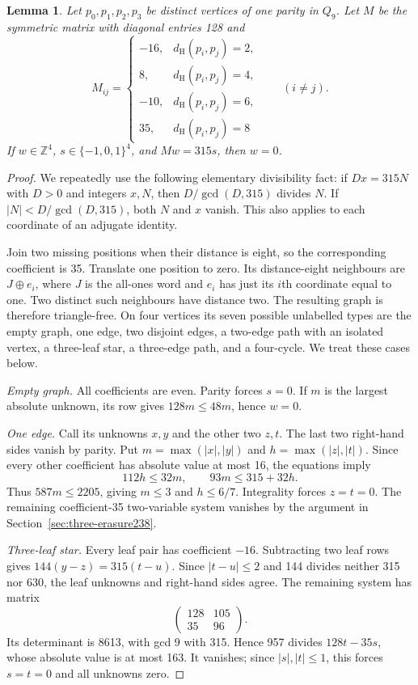 \documentclass[11pt,a4paper]{article}
\newtheorem{lemma}[theorem]{Lemma}
\theoremstyle{definition}
\theoremstyle{remark}
\newcommand{\Ham}{d_{\mathrm H}}
\begin{document}
\begin{lemma}\label{lem:four-matrix239}
Let $p_0,p_1,p_2,p_3$ be distinct vertices of one parity in $Q_9$.
Let $M$ be the symmetric matrix with diagonal entries 128 and
\[
M_{ij}=\begin{cases}
-16,&\Ham(p_i,p_j)=2,\\
8,&\Ham(p_i,p_j)=4,\\
-10,&\Ham(p_i,p_j)=6,\\
35,&\Ham(p_i,p_j)=8
\end{cases}\qquad(i\ne j).
\]
If $w\in\mathbb Z^4$, $s\in\{-1,0,1\}^4$, and $Mw=315s$, then $w=0$.
\end{lemma}
\begin{proof}
We repeatedly use the following elementary divisibility fact:
if $Dx=315N$ with $D>0$ and integers $x,N$, then
$D/\gcd(D,315)$ divides $N$. If $|N|<D/\gcd(D,315)$, both $N$ and $x$
vanish. This also applies to each coordinate of an adjugate identity.

Join two missing positions when their distance is eight, so the
corresponding coefficient is 35. Translate one position to zero.
Its distance-eight neighbours are $J\oplus e_i$, where $J$ is the
all-ones word and $e_i$ has just its $i$th coordinate equal to one.
Two distinct such neighbours have distance two. The resulting graph
is therefore triangle-free. On four vertices its seven possible
unlabelled types are the empty graph, one edge, two disjoint edges,
a two-edge path with an isolated vertex, a three-leaf star, a
three-edge path, and a four-cycle. We treat these cases below.

\smallskip\noindent\emph{Empty graph.}
All coefficients are even. Parity forces $s=0$. If $m$ is the largest
absolute unknown, its row gives $128m\le48m$, hence $w=0$.

\smallskip\noindent\emph{One edge.}
Call its unknowns $x,y$ and the other two $z,t$. The last two right-hand
sides vanish by parity. Put $m=\max(|x|,|y|)$ and
$h=\max(|z|,|t|)$. Since every other coefficient has absolute value at
most 16, the equations imply
\[
112h\le32m,\qquad93m\le315+32h.
\]
Thus $587m\le2205$, giving $m\le3$ and $h\le6/7$. Integrality forces
$z=t=0$. The remaining coefficient-35 two-variable system vanishes by
the argument in Section~\ref{sec:three-erasure238}.

\smallskip\noindent\emph{Three-leaf star.}
Every leaf pair has coefficient $-16$. Subtracting two leaf rows gives
$144(y-z)=315(t-u)$. Since $|t-u|\le2$ and 144 divides neither 315 nor
630, the leaf unknowns and right-hand sides agree. The remaining
system has matrix
\[
\begin{pmatrix}128&105\\35&96\end{pmatrix}.
\]
Its determinant is 8613, with gcd 9 with 315. Hence 957 divides
$128t-35s$, whose absolute value is at most 163. It vanishes; since
$|s|,|t|\le1$, this forces $s=t=0$ and all unknowns zero.


\end{proof}
\end{document}

